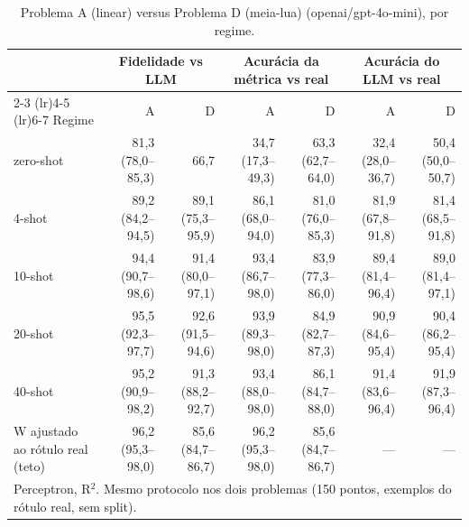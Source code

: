 \begin{table}[htbp]
\centering
\small
\caption{Problema A (linear) versus Problema D (meia-lua) (openai/gpt-4o-mini), por regime.}
\label{tab:bloco1_A_vs_D_por_regime_gpt4mini}
\begin{tabular}{lrrrrrr}
\toprule
 & \multicolumn{2}{c}{Fidelidade vs LLM} & \multicolumn{2}{c}{Acurácia da métrica vs real} & \multicolumn{2}{c}{Acurácia do LLM vs real} \\ \cmidrule(lr){2-3} \cmidrule(lr){4-5} \cmidrule(lr){6-7}
Regime & A & D & A & D & A & D \\
\midrule
zero-shot & 81,3 (78,0–85,3) & 66,7 & 34,7 (17,3–49,3) & 63,3 (62,7–64,0) & 32,4 (28,0–36,7) & 50,4 (50,0–50,7) \\
4-shot & 89,2 (84,2–94,5) & 89,1 (75,3–95,9) & 86,1 (68,0–94,0) & 81,0 (76,0–85,3) & 81,9 (67,8–91,8) & 81,4 (68,5–91,8) \\
10-shot & 94,4 (90,7–98,6) & 91,4 (80,0–97,1) & 93,4 (86,7–98,0) & 83,9 (77,3–86,0) & 89,4 (81,4–96,4) & 89,0 (81,4–97,1) \\
20-shot & 95,5 (92,3–97,7) & 92,6 (91,5–94,6) & 93,9 (89,3–98,0) & 84,9 (82,7–87,3) & 90,9 (84,6–95,4) & 90,4 (86,2–95,4) \\
40-shot & 95,2 (90,9–98,2) & 91,3 (88,2–92,7) & 93,4 (88,0–98,0) & 86,1 (84,7–88,0) & 91,4 (83,6–96,4) & 91,9 (87,3–96,4) \\
\midrule
W ajustado ao rótulo real (teto) & 96,2 (95,3–98,0) & 85,6 (84,7–86,7) & 96,2 (95,3–98,0) & 85,6 (84,7–86,7) & — & — \\
\bottomrule
\multicolumn{7}{p{0.95\linewidth}}{\footnotesize Perceptron, R$^2$. Mesmo protocolo nos dois problemas (150 pontos, exemplos do rótulo real, sem split).} \\
\end{tabular}
\end{table}
